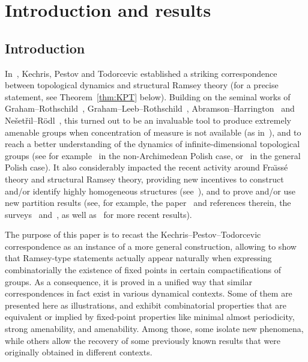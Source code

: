 \documentclass[11pt]{article}
\theoremstyle{definition}
\numberwithin{equation}{section}
\numberwithin{figure}{section}
\numberwithin{table}{section}
\begin{document}
\section{Introduction and results}
\label{section:Intro}

\subsection{Introduction}

In~\cite{KPT}, Kechris, Pestov and Todorcevic established a striking correspondence between topological dynamics and structural Ramsey theory (for a precise statement, see Theorem~\ref{thm:KPT} below). Building on the seminal works of Graham--Rothschild~\cite{GR}, Graham--Leeb--Rothschild~\cite{GLR1, GLR2}, Abramson--\linebreak Harrington~\cite{AH} and Ne\v set\v ril--R\"odl~\cite{NR1,NR2}, this turned out to be an invaluable tool to produce extremely amenable groups when concentration of measure is not available (as in~\cite{GM,Gl1, GP}), and to reach a better understanding of the dynamics of infinite-dimensional topological groups (see for example~\cite{AKL, Z1} in the non-Archimedean Polish case, or~\cite{MT, MNT, BYMT} in the general Polish case). It also considerably impacted the recent activity around Fra\"{\i}ss\'e theory and structural Ramsey theory, providing new incentives to construct and/or identify highly homogeneous structures (see~\cite{KuS, Ku, EFHKKL}), and to prove and/or use new partition results (see, for example, the paper~\cite{Sol6} and references therein, the surveys~\cite{Bod2} and~\cite{NVT6}, as well as~\cite{BaK2, BaK3, BLLM, HN, PS} for more recent results).

The purpose of this paper is to recast the Kechris--Pestov--Todorcevic correspondence as an instance of a more general construction, allowing to show that Ramsey-type statements actually appear naturally when expressing combinatorially the \hbox{existence} of fixed points in certain compactifications of groups. As a consequence, it is proved in a unified way that similar correspondences in fact exist in various dynamical contexts. Some of them are presented here as illustrations, and exhibit combinatorial properties that are equivalent or implied by fixed-point properties like minimal almost periodicity, strong amenability, and amenability. Among those, some isolate new phenomena, while others allow the recovery of some previously known results that were originally obtained in different contexts.
\end{document}
